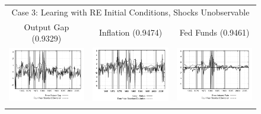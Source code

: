 \begin{figure}
\begin{tabular}{ccc}
\multicolumn{3}{c}{Case 3: Learing with RE Initial Conditions, Shocks Unobservable} \\ 
Output Gap (0.9329) & Inflation (0.9474) & Fed Funds (0.9461) \\
\includegraphics[scale=0.28]{results_reinit/output_err.png} & 
\includegraphics[scale=0.28]{results_reinit/inflation_err.png} & 
\includegraphics[scale=0.28]{results_reinit/fedfunds_err.png} \\ \\ 
 

\end{tabular}
\end{figure}
